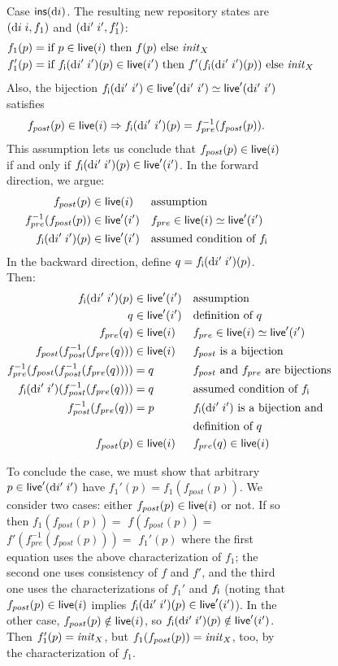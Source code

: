 \begin{figure}
\begin{figure}
\begin{pf}
  Case $\mathsf{ins}(\textrm{d} i)$. The resulting new repository states are $(\textrm{d} i\;i,f_1)$
  and $(\textrm{d} i'\;i', f_1')$:
  \begin{align*}
    f_1(p)&=\text{if }p\in\mathsf{live}(i)\text{ then }f(p)\text{ else }\mathit{init}_X\\
    f_1'(p)&=\text{if }f_{\mathsf{i}}(\textrm{d} i'\;i')(p)\in\mathsf{live}(i')\text{ then }f'(f_{\mathsf{i}}(\textrm{d} i'\;i')(p))\text{ else }\mathit{init}_X
  \end{align*}
Also, the bijection $f_{\mathsf{i}}(\textrm{d} i'\ i')\in\mathsf{live}'(\textrm{d} i'\ i')\simeq \mathsf{live}'(\textrm{d} i'\ i')$ satisfies
\[
f_{post}(p)\in\live(i)\Rightarrow f_\mli(\di'\ i')(p)= f^{-1}_{pre}(f_{post}(p)).
\]
This assumption lets us conclude that $f_{post}(p) \in \mathsf{live}(i)$ if and only
if $f_{\mathsf{i}}(\textrm{d} i'\;i')(p) \in \mathsf{live}'(i')$. In the forward direction, we argue:
\begin{align*}
    f_{post}(p) &\in \mathsf{live}(i) &&\mbox{assumption} \\
    f_{pre}^{-1}(f_{post}(p)) &\in \mathsf{live}'(i') &&f_{pre} \in \mathsf{live}(i) \simeq
    \mathsf{live}'(i') \\
    f_{\mathsf{i}}(\textrm{d} i'\;i')(p) &\in \mathsf{live}'(i') &&\mbox{assumed condition of }f_{\mathsf{i}}
\end{align*}
In the backward direction, define $q=f_{\mathsf{i}}(\textrm{d} i'\;i')(p)$. Then:
\begin{align*}
    f_{\mathsf{i}}(\textrm{d} i'\;i')(p) &\in \mathsf{live}'(i') &&\mbox{assumption} \\
    q &\in \mathsf{live}'(i') &&\mbox{definition of }q \\
    f_{pre}(q) &\in \mathsf{live}(i) &&f_{pre} \in \mathsf{live}(i) \simeq \mathsf{live}'(i') \\
    f_{post}(f_{post}^{-1}(f_{pre}(q))) &\in \mathsf{live}(i) &&f_{post}\mbox{ is a bijection} \\
    f_{pre}^{-1}(f_{post}(f_{post}^{-1}(f_{pre}(q)))) &= q
        &&f_{post}\mbox{ and }f_{pre}\mbox{ are bijections} \\
    f_{\mathsf{i}}(\textrm{d} i'\;i')(f_{post}^{-1}(f_{pre}(q))) &= q
        &&\mbox{assumed condition of }f_{\mathsf{i}} \\
    f_{post}^{-1}(f_{pre}(q)) &= p
        &&f_{\mathsf{i}}(\textrm{d} i'\;i')\mbox{ is a bijection and} \\
       &&&\mbox{definition of }q \\
    f_{post}(p) &\in \mathsf{live}(i) &&f_{pre}(q)\in\mathsf{live}(i)
\end{align*}

To conclude the case, we must show that arbitrary $p \in \mathsf{live}'(\textrm{d} i'\;i')$
have $f_1'(p)=f_1(f_{post}(p))$. We consider two cases: either $f_{post}(p)
\in \mathsf{live}(i)$ or not. If so then $f_1(f_{post}(p))=$ $f(f_{post}(p)) = $
$f'(f_{pre}^{-1}(f_{post}(p)))= $ $f_1'(p)$ where the first equation uses
the above characterization of $f_1$; the second one uses consistency of $f$
and $f'$, and the third one uses the characterizations of $f_1'$ and $f_{\mathsf{i}}$
(noting that $f_{post}(p) \in \mathsf{live}(i)$ implies $f_{\mathsf{i}}(\textrm{d} i'\;i')(p) \in
\mathsf{live}'(i')$). In the other case, $f_{post}(p) \notin \mathsf{live}(i)$, so
$f_{\mathsf{i}}(\textrm{d} i'\;i')(p) \notin \mathsf{live}'(i')$. Then $f_1'(p)=\mathit{init}_X$, but
$f_1(f_{post}(p))=\mathit{init}_X$, too, by the characterization of $f_1$.


\end{pf}
\end{figure}
\end{figure}
